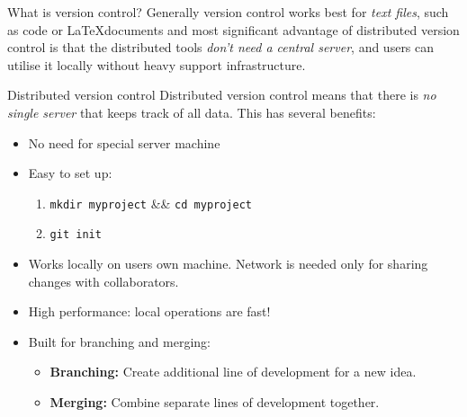 \documentclass[final,hyperref={pdfpagelabels=false},notitlepage=true]{beamer}
\begin{document}
\begin{frame}{}
\begin{columns}[t]
\begin{column}{0.45\linewidth}
\begin{block}{\large What is version control?}
\vpace{1cm}
      Generally version control works best for \emph{text files}, such
      as code or \LaTeX documents and
most significant advantage of distributed version control is that the distributed
tools \emph{don't need a central server}, 
and users can utilise it locally without heavy support infrastructure.

    \end{block}

    \begin{block}{\large Distributed version control}
      Distributed version control means that there is \emph{no single server}
      that keeps track of all data. This has several benefits:
      \begin{itemize}
        \item No need for special server machine
        \item Easy to set up:
          \begin{enumerate}
            \item {\tt mkdir myproject} \&\& {\tt cd myproject}
            \item {\tt git init}
          \end{enumerate}
        \item Works locally on users own machine. Network is needed
          only for sharing changes with collaborators.
        \item High performance: local operations are fast!
        \item Built for branching and merging:
          \begin{itemize}
            \item {\bf Branching:} Create additional line of
              development for a new idea.
            \item {\bf Merging:} Combine separate lines of development
              together.
          \end{itemize}
      \end{itemize}
    \end{block}


\end{column}
\end{columns}
\end{frame}
\end{document}
